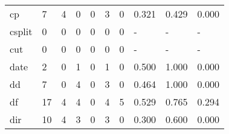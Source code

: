 \begin{longtable}{lp{2.0cm}p{2.0cm}p{2.0cm}p{2.0cm}p{2.0cm}p{2.0cm}p{2.0cm}p{2.0cm}p{2.0cm}}
cp        &                      7 &                                  4 &                                 0 &                                0 &                                 3 &                               0 &                                0.321 &                                  0.429 &                                0.000 \\
csplit    &                      0 &                                  0 &                                 0 &                                0 &                                 0 &                               0 &                                    - &                                      - &                                    - \\
cut       &                      0 &                                  0 &                                 0 &                                0 &                                 0 &                               0 &                                    - &                                      - &                                    - \\
date      &                      2 &                                  0 &                                 1 &                                0 &                                 1 &                               0 &                                0.500 &                                  1.000 &                                0.000 \\
dd        &                      7 &                                  0 &                                 4 &                                0 &                                 3 &                               0 &                                0.464 &                                  1.000 &                                0.000 \\
df        &                     17 &                                  4 &                                 4 &                                0 &                                 4 &                               5 &                                0.529 &                                  0.765 &                                0.294 \\
dir       &                     10 &                                  4 &                                 3 &                                0 &                                 3 &                               0 &                                0.300 &                                  0.600 &                                0.000 \\

\end{longtable}
